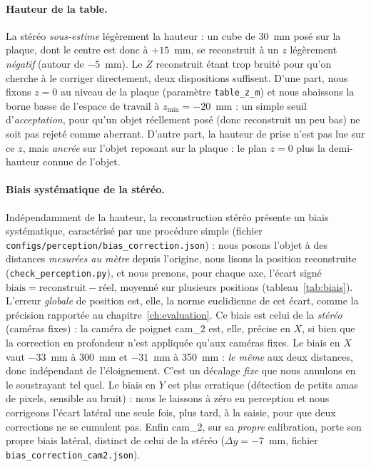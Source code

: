 \paragraph{Hauteur de la table.} La stéréo \emph{sous-estime} légèrement la hauteur : un cube de 30~mm posé sur la plaque, dont le centre est donc à $+15$~mm, se reconstruit à un $z$ légèrement \emph{négatif} (autour de $-5$~mm). Le $Z$ reconstruit étant trop bruité pour qu'on cherche à le corriger directement, deux dispositions suffisent. D'une part, nous fixons $z=0$ au niveau de la plaque (paramètre \texttt{table\_z\_m}) et nous abaissons la borne basse de l'espace de travail à $z_{\min}=-20$~mm : un simple seuil d'\emph{acceptation}, pour qu'un objet réellement posé (donc reconstruit un peu bas) ne soit pas rejeté comme aberrant. D'autre part, la hauteur de prise n'est pas lue sur ce $z$, mais \emph{ancrée} sur l'objet reposant sur la plaque : le plan $z=0$ plus la demi-hauteur connue de l'objet.

\paragraph{Biais systématique de la stéréo.} Indépendamment de la hauteur, la reconstruction stéréo présente un biais systématique, caractérisé par une procédure simple (fichier \texttt{configs/perception/\allowbreak bias\_correction.json}) : nous posons l'objet à des distances \emph{mesurées au mètre} depuis l'origine, nous lisons la position reconstruite (\texttt{check\_perception.py}), et nous prenons, pour chaque axe, l'écart signé $\text{biais}=\text{reconstruit}-\text{réel}$, moyenné sur plusieurs positions (tableau~\ref{tab:biais}). L'erreur \emph{globale} de position est, elle, la norme euclidienne de cet écart, comme la précision rapportée au chapitre~\ref{ch:evaluation}. Ce biais est celui de la \emph{stéréo} (caméras fixes) : la caméra de poignet cam\_2 est, elle, précise en $X$, si bien que la correction en profondeur n'est appliquée qu'aux caméras fixes. Le biais en $X$ vaut $-33$~mm à 300~mm et $-31$~mm à 350~mm : \emph{le même} aux deux distances, donc indépendant de l'éloignement. C'est un décalage \emph{fixe} que nous annulons en le soustrayant tel quel. Le biais en $Y$ est plus erratique (détection de petits amas de pixels, sensible au bruit) : nous le laissons à zéro en perception et nous corrigeons l'écart latéral une seule fois, plus tard, à la saisie, pour que deux corrections ne se cumulent pas. Enfin cam\_2, sur sa \emph{propre} calibration, porte son propre biais latéral, distinct de celui de la stéréo ($\Delta y=-7$~mm, fichier \texttt{bias\_correction\_cam2.json}).

